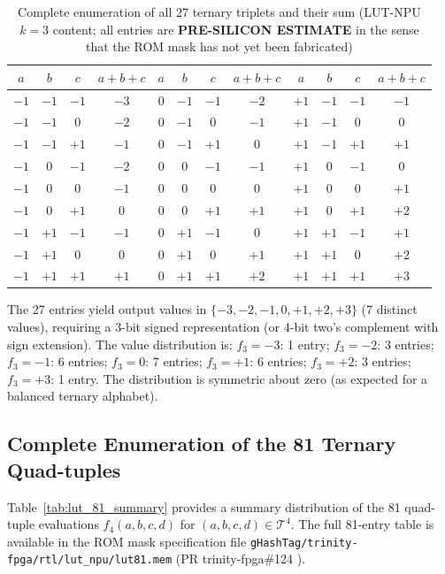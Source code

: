 \begin{table}[ht]
\centering
\caption{Complete enumeration of all 27 ternary triplets and their sum
  (LUT-NPU $k=3$ content; all entries are \textbf{PRE-SILICON ESTIMATE}
  in the sense that the ROM mask has not yet been fabricated)}
\label{tab:lut_27}
\begin{tabular}{ccc|c||ccc|c||ccc|c}
\hline
$a$ & $b$ & $c$ & $a{+}b{+}c$ &
$a$ & $b$ & $c$ & $a{+}b{+}c$ &
$a$ & $b$ & $c$ & $a{+}b{+}c$ \\
\hline
$-1$ & $-1$ & $-1$ & $-3$ & $0$ & $-1$ & $-1$ & $-2$ & $+1$ & $-1$ & $-1$ & $-1$ \\
$-1$ & $-1$ & $ 0$ & $-2$ & $0$ & $-1$ & $ 0$ & $-1$ & $+1$ & $-1$ & $ 0$ & $ 0$ \\
$-1$ & $-1$ & $+1$ & $-1$ & $0$ & $-1$ & $+1$ & $ 0$ & $+1$ & $-1$ & $+1$ & $+1$ \\
$-1$ & $ 0$ & $-1$ & $-2$ & $0$ & $ 0$ & $-1$ & $-1$ & $+1$ & $ 0$ & $-1$ & $ 0$ \\
$-1$ & $ 0$ & $ 0$ & $-1$ & $0$ & $ 0$ & $ 0$ & $ 0$ & $+1$ & $ 0$ & $ 0$ & $+1$ \\
$-1$ & $ 0$ & $+1$ & $ 0$ & $0$ & $ 0$ & $+1$ & $+1$ & $+1$ & $ 0$ & $+1$ & $+2$ \\
$-1$ & $+1$ & $-1$ & $-1$ & $0$ & $+1$ & $-1$ & $ 0$ & $+1$ & $+1$ & $-1$ & $+1$ \\
$-1$ & $+1$ & $ 0$ & $ 0$ & $0$ & $+1$ & $ 0$ & $+1$ & $+1$ & $+1$ & $ 0$ & $+2$ \\
$-1$ & $+1$ & $+1$ & $+1$ & $0$ & $+1$ & $+1$ & $+2$ & $+1$ & $+1$ & $+1$ & $+3$ \\
\hline
\end{tabular}
\end{table}

\noindent The 27 entries yield output values in $\{-3,-2,-1,0,+1,+2,+3\}$
(7 distinct values), requiring a 3-bit signed representation (or 4-bit two's
complement with sign extension).  The value distribution is:
$f_3 = -3$: 1 entry; $f_3 = -2$: 3 entries; $f_3 = -1$: 6 entries;
$f_3 = 0$: 7 entries; $f_3 = +1$: 6 entries; $f_3 = +2$: 3 entries;
$f_3 = +3$: 1 entry.  The distribution is symmetric about zero
(as expected for a balanced ternary alphabet).

\subsection{Complete Enumeration of the 81 Ternary Quad-tuples}

Table~\ref{tab:lut_81_summary} provides a summary distribution of
the 81 quad-tuple evaluations $f_4(a,b,c,d)$ for $(a,b,c,d) \in \mathcal{T}^4$.
The full 81-entry table is available in the ROM mask specification file
\texttt{gHashTag/trinity-fpga/rtl/lut\_npu/lut81.mem} (PR trinity-fpga\#124
\cite{rtl_lut_npu_trinity_fpga_124}).

